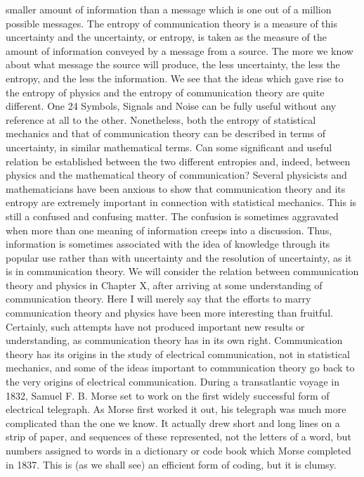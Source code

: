 smaller amount of information than a message which is one out
of a million possible messages. The entropy of communication
theory is a measure of this uncertainty and the uncertainty, or
entropy, is taken as the measure of the amount of information
conveyed by a message from a source. The more we know about
what message the source will produce, the less uncertainty, the
less the entropy, and the less the information.
We see that the ideas which gave rise to the entropy of physics
and the entropy of communication theory are quite different. One
24
Symbols, Signals and Noise
can be fully useful without any reference at all to the other. Nonetheless,
both the entropy of statistical mechanics and that of
communication theory can be described in terms of uncertainty,
in similar mathematical terms. Can some significant and useful
relation be established between the two different entropies and,
indeed, between physics and the mathematical theory of communication?
Several physicists and mathematicians have been anxious to
show that communication theory and its entropy are extremely
important in connection with statistical mechanics. This is still a
confused and confusing matter. The confusion is sometimes aggravated
when more than one meaning of information creeps into a
discussion. Thus, information is sometimes associated with the idea
of knowledge through its popular use rather than with uncertainty
and the resolution of uncertainty, as it is in communication theory.
We will consider the relation between communication theory
and physics in Chapter X, after arriving at some understanding of
communication theory. Here I will merely say that the efforts to
marry communication theory and physics have been more interesting
than fruitful. Certainly, such attempts have not produced
important new results or understanding, as communication theory
has in its own right.
Communication theory has its origins in the study of electrical
communication, not in statistical mechanics, and some of the
ideas important to communication theory go back to the very
origins of electrical communication.
During a transatlantic voyage in 1832, Samuel F. B. Morse set
to work on the first widely successful form of electrical telegraph.
As Morse first worked it out, his telegraph was much more complicated
than the one we know. It actually drew short and long
lines on a strip of paper, and sequences of these represented, not
the letters of a word, but numbers assigned to words in a dictionary
or code book which Morse completed in 1837. This is (as we
shall see) an efficient form of coding, but it is clumsy.
